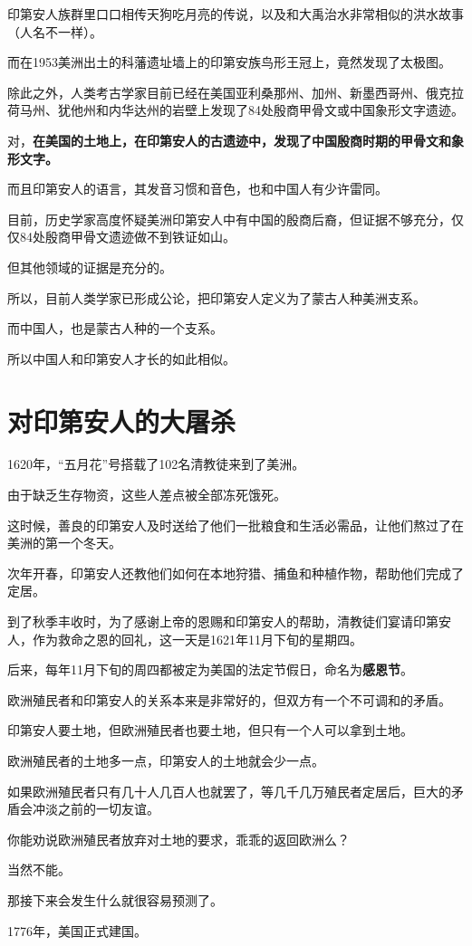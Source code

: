 \documentclass[UTF8, 11pt, oneside]{ctexart}
\newcommand{\zd}[1]{\textbf{\textcolor[RGB]{123,12,0}{#1}}} %
\newcommand{\biaoti}[1]{%
    \section*{#1}
}
\begin{document}
印第安人族群里口口相传天狗吃月亮的传说，以及和大禹治水非常相似的洪水故事（人名不一样）。

而在1953美洲出土的科藩遗址墙上的印第安族鸟形王冠上，竟然发现了太极图。

除此之外，人类考古学家目前已经在美国亚利桑那州、加州、新墨西哥州、俄克拉荷马州、犹他州和内华达州的岩壁上发现了84处殷商甲骨文或中国象形文字遗迹。

对，\zd{在美国的土地上，在印第安人的古遗迹中，发现了中国殷商时期的甲骨文和象形文字。}

而且印第安人的语言，其发音习惯和音色，也和中国人有少许雷同。

目前，历史学家高度怀疑美洲印第安人中有中国的殷商后裔，但证据不够充分，仅仅84处殷商甲骨文遗迹做不到铁证如山。

但其他领域的证据是充分的。

所以，目前人类学家已形成公论，把印第安人定义为了蒙古人种美洲支系。

而中国人，也是蒙古人种的一个支系。

所以中国人和印第安人才长的如此相似。


\biaoti{对印第安人的大屠杀}

1620年，“五月花”号搭载了102名清教徒来到了美洲。

由于缺乏生存物资，这些人差点被全部冻死饿死。

这时候，善良的印第安人及时送给了他们一批粮食和生活必需品，让他们熬过了在美洲的第一个冬天。

次年开春，印第安人还教他们如何在本地狩猎、捕鱼和种植作物，帮助他们完成了定居。

到了秋季丰收时，为了感谢上帝的恩赐和印第安人的帮助，清教徒们宴请印第安人，作为救命之恩的回礼，这一天是1621年11月下旬的星期四。

后来，每年11月下旬的周四都被定为美国的法定节假日，命名为\zd{感恩节}。

欧洲殖民者和印第安人的关系本来是非常好的，但双方有一个不可调和的矛盾。

印第安人要土地，但欧洲殖民者也要土地，但只有一个人可以拿到土地。

欧洲殖民者的土地多一点，印第安人的土地就会少一点。

如果欧洲殖民者只有几十人几百人也就罢了，等几千几万殖民者定居后，巨大的矛盾会冲淡之前的一切友谊。

你能劝说欧洲殖民者放弃对土地的要求，乖乖的返回欧洲么？

当然不能。

那接下来会发生什么就很容易预测了。

1776年，美国正式建国。
\end{document}
